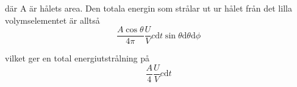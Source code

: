 där A är hålets area. Den totala energin som strålar ut ur hålet från det lilla volymselementet är alltså 
\begin{equation}
\frac{A\cos\theta}{4\pi}\frac{U}{V} c\mathrm{d}t \sin\theta\mathrm{d}\theta \mathrm{d}\phi
\end{equation}

vilket ger en total energiutstrålning på
\begin{equation}
\frac{A}{4}\frac{U}{V}c \mathrm{d}t
\end{equation}

